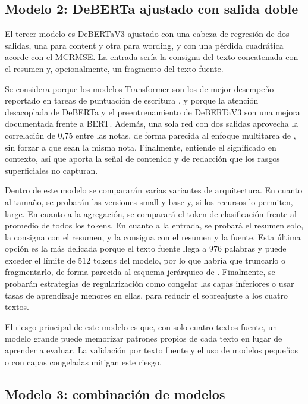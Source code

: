 \documentclass[11pt,a4paper]{article}
\begin{document}
\subsection{Modelo 2: DeBERTa ajustado con salida doble}

El tercer modelo es DeBERTaV3 \citep{he2021,he2023} ajustado con una cabeza de regresión de dos salidas, una para content y otra para wording, y con una pérdida cuadrática acorde con el MCRMSE. La entrada sería la consigna del texto concatenada con el resumen y, opcionalmente, un fragmento del texto fuente.

Se considera porque los modelos Transformer son los de mejor desempeño reportado en tareas de puntuación de escritura \citep{uto2021,xue2021,ludwig2021}, y porque la atención desacoplada de DeBERTa y el preentrenamiento de DeBERTaV3 son una mejora documentada frente a BERT. Además, una sola red con dos salidas aprovecha la correlación de 0,75 entre las notas, de forma parecida al enfoque multitarea de \citet{xue2021}, sin forzar a que sean la misma nota. Finalmente, entiende el significado en contexto, así que aporta la señal de contenido y de redacción que los rasgos superficiales no capturan.

Dentro de este modelo se compararán varias variantes de arquitectura. En cuanto al tamaño, se probarán las versiones small y base y, si los recursos lo permiten, large. En cuanto a la agregación, se comparará el token de clasificación frente al promedio de todos los tokens. En cuanto a la entrada, se probará el resumen solo, la consigna con el resumen, y la consigna con el resumen y la fuente. Esta última opción es la más delicada porque el texto fuente llega a 976 palabras y puede exceder el límite de 512 tokens del modelo, por lo que habría que truncarlo o fragmentarlo, de forma parecida al esquema jerárquico de \citet{xue2021}. Finalmente, se probarán estrategias de regularización como congelar las capas inferiores o usar tasas de aprendizaje menores en ellas, para reducir el sobreajuste a los cuatro textos.

El riesgo principal de este modelo es que, con solo cuatro textos fuente, un modelo grande puede memorizar patrones propios de cada texto en lugar de aprender a evaluar. La validación por texto fuente y el uso de modelos pequeños o con capas congeladas mitigan este riesgo.

\subsection{Modelo 3: combinación de modelos}
\end{document}
